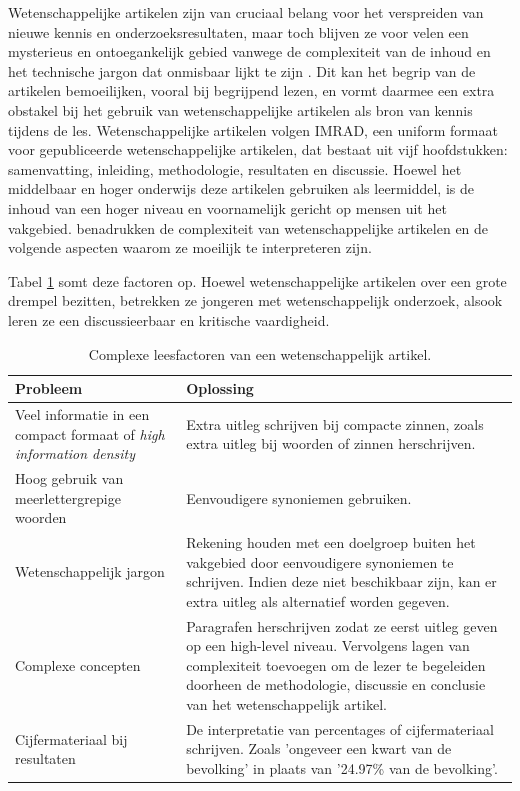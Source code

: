 Wetenschappelijke artikelen zijn van cruciaal belang voor het verspreiden van nieuwe kennis en onderzoeksresultaten, maar toch blijven ze voor velen een mysterieus en ontoegankelijk gebied vanwege de complexiteit van de inhoud en het technische jargon dat onmisbaar lijkt te zijn \autocite{Ball2017}. Dit kan het begrip van de artikelen bemoeilijken, vooral bij begrijpend lezen, en vormt daarmee een extra obstakel bij het gebruik van wetenschappelijke artikelen als bron van kennis tijdens de les. Wetenschappelijke artikelen volgen IMRAD, een uniform formaat voor gepubliceerde wetenschappelijke artikelen, dat bestaat uit vijf hoofdstukken: samenvatting, inleiding, methodologie, resultaten en discussie. Hoewel het middelbaar en hoger onderwijs deze artikelen gebruiken als leermiddel,  is  de inhoud van een hoger niveau en voornamelijk gericht op mensen uit het vakgebied. \textcite{Pain2016, CAS2021} benadrukken de complexiteit van wetenschappelijke artikelen en de volgende aspecten waarom ze moeilijk te interpreteren zijn.

\medspace

Tabel \ref{table:scientific-paper-struggles} somt deze factoren op. Hoewel wetenschappelijke artikelen over een grote drempel bezitten, betrekken ze jongeren met wetenschappelijk onderzoek, alsook leren ze een discussieerbaar en kritische vaardigheid. 

\medspace

\begin{center}
	\begin{table}[H]
	\begin{tabular}{| m{5cm} | m{10cm} |}
		\hline
		\textbf{Probleem} & \textbf{Oplossing} \\
		\hline
		Veel informatie in een compact formaat of \textit{high information density} & Extra uitleg schrijven bij compacte zinnen, zoals extra uitleg bij woorden of zinnen herschrijven. \\
		\hline
		Hoog gebruik van meerlettergrepige woorden & Eenvoudigere synoniemen gebruiken. \\
		\hline
		Wetenschappelijk jargon & Rekening houden met een doelgroep buiten het vakgebied door eenvoudigere synoniemen te schrijven. Indien deze niet beschikbaar zijn, kan er extra uitleg als alternatief worden gegeven. \\
		\hline
		Complexe concepten & Paragrafen herschrijven zodat ze eerst uitleg geven op een high-level niveau. Vervolgens lagen van complexiteit toevoegen om de lezer te begeleiden doorheen de methodologie, discussie en conclusie van het wetenschappelijk artikel. \\ 
		\hline
		Cijfermateriaal bij resultaten & De interpretatie van percentages of cijfermateriaal schrijven. Zoals 'ongeveer een kwart van de bevolking' in plaats van '24.97\% van de bevolking'. \\
		\hline
	\end{tabular}
	\caption{Complexe leesfactoren van een wetenschappelijk artikel.}
	\label{table:scientific-paper-struggles}
	\end{table}
\end{center}


